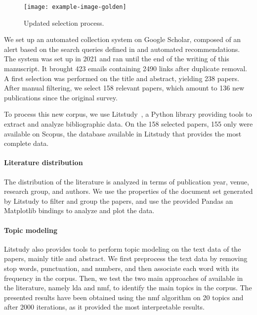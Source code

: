 \begin{figure}
\centering
  \texttt{[image: example-image-golden]}
  \caption{Updated selection process.}
  \label{fig:sota.methodo.update}
\end{figure}

We set up an automated collection system on Google Scholar, composed of an alert based on the search queries defined in  and automated recommendations.
The system was set up in 2021 and ran until the end of the writing of this manuscript. 
It brought 423 emails containing 2490 links after duplicate removal.
A first selection was performed on the title and abstract, yielding 238 papers.
After manual filtering, we select 158 relevant papers, which amount to 136 new publications since the original survey.

To process this new corpus, we use Litstudy~\cite{heldens_litstudyPythonpackage_2022}, a Python library providing tools to extract and analyze bibliographic data.
On the 158 selected papers, 155 only were available on Scopus, the database available in Litstudy that provides the most complete data.

\paragraph{Literature distribution}

The distribution of the literature is analyzed in terms of publication year, venue, research group, and authors.
We use the properties of the document set generated by Litstudy to filter and group the papers, and use the provided Pandas an Matplotlib bindings to analyze and plot the data.

\paragraph{Topic modeling}

Litstudy also provides tools to perform topic modeling on the text data of the papers, mainly title and abstract.
We first preprocess the text data by removing stop words, punctuation, and numbers, and then associate each word with its frequency in the corpus.
Then, we test the two main approaches of available in the literature, namely \gls{lda} and \gls{nmf}, to identify the main topics in the corpus.
The presented results have been obtained using the \gls{nmf} algorithm on 20 topics and after 2000 iterations, as it provided the most interpretable results.

